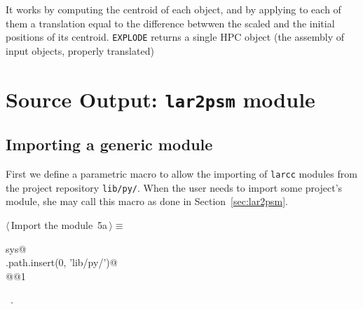 \documentclass[11pt,oneside]{article}	%
\begin{document}
It works by computing the centroid of each object, and by applying to each of them a translation equal to the difference betwwen the scaled and the initial positions of its centroid. 
\texttt{EXPLODE}  returns a single HPC object (the assembly of input objects, properly translated)

\section{Source Output: \texttt{lar2psm} module}


\subsection{Importing a generic module}
First we define a parametric macro to allow the importing of \texttt{larcc} modules from the project repository \texttt{lib/py/}. When the user needs to import some project's module, she may call this macro as done in Section~\ref{sec:lar2psm}.
\begin{flushleft} \small
\begin{minipage}{\linewidth} \label{scrap12}
\protect{}$\langle\,$Import the module\nobreak\ {\footnotesize 5a}$\,\rangle\equiv$
\vspace{-1ex}
\begin{list}{}{} \item
\mbox{}\verb@import sys@\\
\mbox{}\verb@sys.path.insert(0, 'lib/py/')@\\
\mbox{}\verb@import @@1\verb@@\\
\mbox{}\verb@@{\NWsep}
\end{list}
\vspace{-1ex}
\footnotesize\addtolength{\baselineskip}{-1ex}
\begin{list}{}{\setlength{\itemsep}{-\parsep}\setlength{\itemindent}{-\leftmargin}}
\item \NWtxtMacroRefIn\ .
\end{list}
\end{minipage}\\[4ex]
\end{flushleft}
\end{document}
